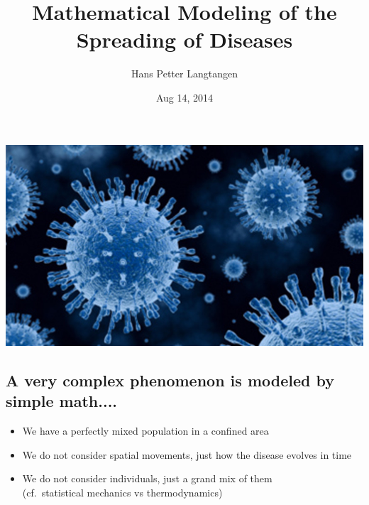\documentclass[%
twoside,                 %
final,                   %
10pt]{article}
\newenvironment{block_mdfboxadmon}[1][]{
\begin{block_mdfboxmdframed}[frametitle=#1]
}
{
\end{block_mdfboxmdframed}
}
\begin{document}






\title{Mathematical Modeling of the Spreading of Diseases}


\author{Hans Petter Langtangen}

\date{Aug 14, 2014
}

\begin{center}  %
  \centerline{\includegraphics[width=0.9\linewidth]{fig/disease1.jpg}}
\end{center}


\subsection{A very complex phenomenon is modeled by simple math....}


\begin{block_mdfboxadmon}[Assumptions:]
\begin{itemize}
 \item We have a perfectly mixed population in a confined area

 \item We do not consider spatial movements, just how the disease
   evolves in time

 \item We do not consider individuals, just a grand mix of them\\
   (cf.~statistical mechanics vs thermodynamics)
\end{itemize}

\noindent
\end{block_mdfboxadmon}
\end{document}
